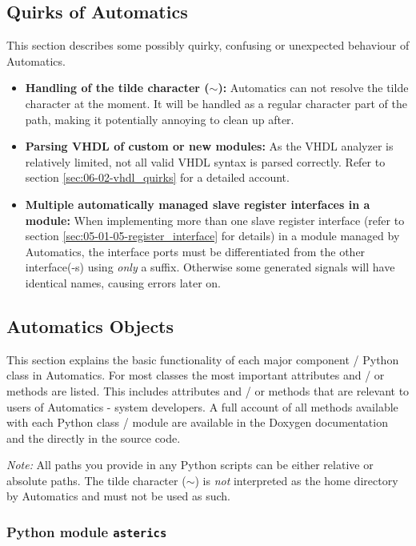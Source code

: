 \subsection{Quirks of Automatics}
\label{sec:06-02-quirks}
This section describes some possibly quirky, confusing or unexpected behaviour of Automatics.

\begin{itemize}
\item \textbf{Handling of the tilde character ($\sim$):} Automatics can not resolve the tilde character at the moment. It will be handled as a regular character part of the path, making it potentially annoying to clean up after.
\item \textbf{Parsing VHDL of custom or new modules:} As the VHDL analyzer is relatively limited, not all valid VHDL syntax is parsed correctly. Refer to section \ref{sec:06-02-vhdl_quirks} for a detailed account.
\item \textbf{Multiple automatically managed slave register interfaces in a module:} When implementing more than one slave register interface (refer to section \ref{sec:05-01-05-register_interface} for details) in a module managed by Automatics, the interface ports must be differentiated from the other interface(-s) using \emph{only} a suffix. Otherwise some generated signals will have identical names, causing errors later on.
\end{itemize}

\subsection{Automatics Objects}
\label{sec:06-02-objects}

This section explains the basic functionality of each major component / Python class in Automatics.
For most classes the most important attributes and / or methods are listed.
This includes attributes and / or methods that are relevant to users of Automatics - \asterics system developers.
A full account of all methods available with each Python class / module are available in the Doxygen documentation and the directly in the source code.

\textit{Note:} All paths you provide in any Python scripts can be either relative or absolute paths. The tilde character ({$\sim$}) is \emph{not} interpreted as the home directory by Automatics and must not be used as such.

\subsubsection{Python module \texttt{asterics}}
\label{ssec:06-02-asterics_pymodule}

